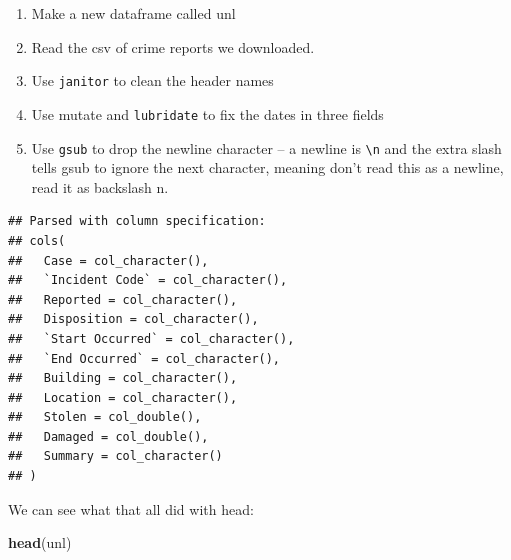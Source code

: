 \documentclass[]{book}
\newenvironment{Shaded}{\begin{snugshade}}{\end{snugshade}}
\newcommand{\CharTok}[1]{\textcolor[rgb]{0.31,0.60,0.02}{#1}}
\newcommand{\DataTypeTok}[1]{\textcolor[rgb]{0.13,0.29,0.53}{#1}}
\newcommand{\KeywordTok}[1]{\textcolor[rgb]{0.13,0.29,0.53}{\textbf{#1}}}
\newcommand{\NormalTok}[1]{#1}
\newcommand{\OperatorTok}[1]{\textcolor[rgb]{0.81,0.36,0.00}{\textbf{#1}}}
\newcommand{\StringTok}[1]{\textcolor[rgb]{0.31,0.60,0.02}{#1}}
\providecommand{\tightlist}{%
  \setlength{\itemsep}{0pt}\setlength{\parskip}{0pt}}
\begin{document}
\begin{enumerate}
\def\labelenumi{\arabic{enumi}.}
\tightlist
\item
  Make a new dataframe called unl
\item
  Read the csv of crime reports we downloaded.
\item
  Use \texttt{janitor} to clean the header names
\item
  Use mutate and \texttt{lubridate} to fix the dates in three fields
\item
  Use \texttt{gsub} to drop the newline character -- a newline is \texttt{\textbackslash{}n} and the extra slash tells gsub to ignore the next character, meaning don't read this as a newline, read it as backslash n.
\end{enumerate}

\begin{Shaded}
\end{Shaded}

\begin{verbatim}
## Parsed with column specification:
## cols(
##   Case = col_character(),
##   `Incident Code` = col_character(),
##   Reported = col_character(),
##   Disposition = col_character(),
##   `Start Occurred` = col_character(),
##   `End Occurred` = col_character(),
##   Building = col_character(),
##   Location = col_character(),
##   Stolen = col_double(),
##   Damaged = col_double(),
##   Summary = col_character()
## )
\end{verbatim}

We can see what that all did with head:

\begin{Shaded}
\begin{Highlighting}[]
\KeywordTok{head}\NormalTok{(unl)}
\end{Highlighting}
\end{Shaded}
\end{document}
